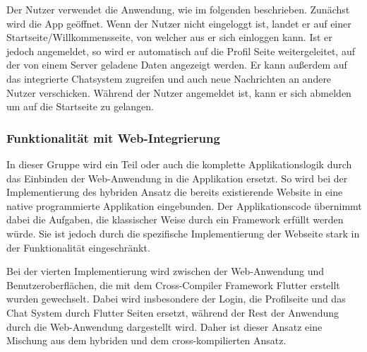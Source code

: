 Der Nutzer verwendet die Anwendung, wie im folgenden beschrieben. Zunächst wird die App geöffnet. Wenn der Nutzer nicht eingeloggt ist, landet er auf einer Startseite/Willkommensseite, von welcher aus er sich einloggen kann. Ist er jedoch angemeldet, so wird er automatisch auf die Profil Seite weitergeleitet, auf der von einem Server geladene Daten angezeigt werden. Er kann außerdem auf das integrierte Chatsystem zugreifen und auch neue Nachrichten an andere Nutzer verschicken. Während der Nutzer angemeldet ist, kann er sich abmelden um auf die Startseite zu gelangen.

\subsubsection{Funktionalität mit Web-Integrierung}
In dieser Gruppe wird ein Teil oder auch die komplette Applikationslogik durch das Einbinden der Web-Anwendung in die Applikation ersetzt. So wird bei der Implementierung des hybriden Ansatz die bereits existierende Website in eine native programmierte Applikation eingebunden. Der Applikationscode übernimmt dabei die Aufgaben, die klassischer Weise durch ein Framework erfüllt werden würde. Sie ist jedoch durch die spezifische Implementierung der Webseite stark in der Funktionalität eingeschränkt.

Bei der vierten Implementierung wird zwischen der Web-Anwendung und Benutzeroberflächen, die mit dem Cross-Compiler Framework Flutter erstellt wurden gewechselt. Dabei wird insbesondere der Login, die Profilseite und das Chat System durch Flutter Seiten ersetzt, während der Rest der Anwendung durch die Web-Anwendung dargestellt wird. Daher ist dieser Ansatz eine Mischung aus dem hybriden und dem cross-kompilierten Ansatz.


